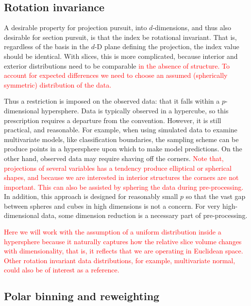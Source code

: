 \documentclass[]{interact}
\theoremstyle{plain}%
\theoremstyle{definition}
\theoremstyle{remark}
\begin{document}
\hypertarget{rotation-invariance}{%
\subsection{\texorpdfstring{Rotation invariance
\label{sec:rotinv}}{Rotation invariance }}\label{rotation-invariance}}

A desirable property for projection pursuit, into \(d\)-dimensions, and
thus also desirable for section pursuit, is that the index be rotational
invariant. That is, regardless of the basis in the \(d\)-D plane
defining the projection, the index value should be identical. With
slices, this is more complicated, because interior and exterior
distributions need to be comparable
\textcolor{red}{in the absence of structure. To account for expected differences we need to choose an assumed (spherically symmetric) distribution of the data.}

Thus a restriction is imposed on the observed data: that it falls within
a \(p\)-dimensional hypersphere. Data is typically observed in a
hypercube, so this prescription requires a departure from the
convention. However, it is still practical, and reasonable. For example,
when using simulated data to examine multivariate models, like
classification boundaries, the sampling scheme can be produce points in
a hypersphere upon which to make model predictions. On the other hand,
observed data may require shaving off the corners.
\textcolor{red}{Note that, projections of several variables has a tendency produce elliptical or spherical shapes, and because we are interested in interior structures the corners are not important. This can also be assisted by sphering the data during pre-processing.}
In addition, this approach is designed for reasonably small \(p\) so
that the vast gap between spheres and cubes in high dimensions is not a
concern. For very high-dimensional data, some dimension reduction is a
necessary part of pre-processing.

\textcolor{red}{Here we will work with the assumption of a uniform distribution inside a hypersphere because it naturally captures how the relative slice volume changes with dimensionality, that is, it reflects that we are operating in Euclidean space. Other rotation invariant data distributions, for example, multivariate normal, could also be of interest as a reference.}

\hypertarget{polar-binning-and-reweighting}{%
\subsection{\texorpdfstring{Polar binning and reweighting
\label{sec:binning}}{Polar binning and reweighting }}\label{polar-binning-and-reweighting}}
\end{document}

